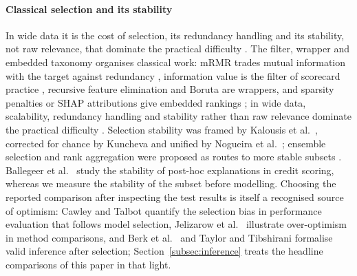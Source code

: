 \documentclass[final,5p,twocolumn]{elsarticle}
\providecommand{\DIFaddtex}[1]{{\protect\color{blue} \sf #1}} %
\providecommand{\DIFdeltex}[1]{{\protect\color{red} \scriptsize #1}} %
\providecommand{\DIFaddbegin}{} %
\providecommand{\DIFaddend}{} %
\providecommand{\DIFdelbegin}{} %
\providecommand{\DIFdelend}{} %
\providecommand{\DIFadd}[1]{\texorpdfstring{\DIFaddtex{#1}}{#1}} %
\providecommand{\DIFdel}[1]{\texorpdfstring{\DIFdeltex{#1}}{}} %
\begin{document}
\paragraph{Classical selection and its stability}
\DIFaddbegin \DIFadd{In wide data it is the cost of selection, its redundancy handling and its stability, not raw relevance, that dominate the practical difficulty \cite{boloncanedo2015}. }\DIFaddend The filter, wrapper and embedded taxonomy \cite{kohavi1997,guyon2003} organises classical work: mRMR trades mutual information with the target against redundancy \cite{peng2005}, information value is the filter of scorecard practice \cite{siddiqi2006}, recursive feature elimination \cite{guyon2002} and Boruta \cite{kursa2010,breiman2001} are wrappers, and sparsity penalties \cite{tibshirani1996} or SHAP attributions \cite{lundberg2017} give embedded rankings\DIFdelbegin \DIFdel{; in wide data, scalability, redundancy handling and stability rather than raw relevance dominate the practical difficulty \cite{boloncanedo2015}}\DIFdelend . Selection stability was framed by Kalousis et al.\ \cite{kalousis2007}, corrected for chance by Kuncheva \cite{kuncheva2007} and unified by Nogueira et al.\ \cite{nogueira2018}; ensemble selection and rank aggregation were proposed as routes to more stable subsets \cite{saeys2008,dwork2001}. Ballegeer et al.\ \cite{ballegeer2025} study the stability of post-hoc explanations in credit scoring, whereas we measure the stability of the subset before modelling. Choosing the reported comparison after inspecting the test results is itself a recognised source of optimism: Cawley and Talbot \cite{cawley2010} quantify the selection bias in performance evaluation that follows model selection, Jelizarow et al.\ \cite{jelizarow2010} illustrate over-optimism in method comparisons, and Berk et al.\ \cite{berk2013} and Taylor and Tibshirani \cite{taylor2015} formalise valid inference after selection; Section~\ref{subsec:inference} treats the headline comparisons of this paper in that light.
\end{document}
